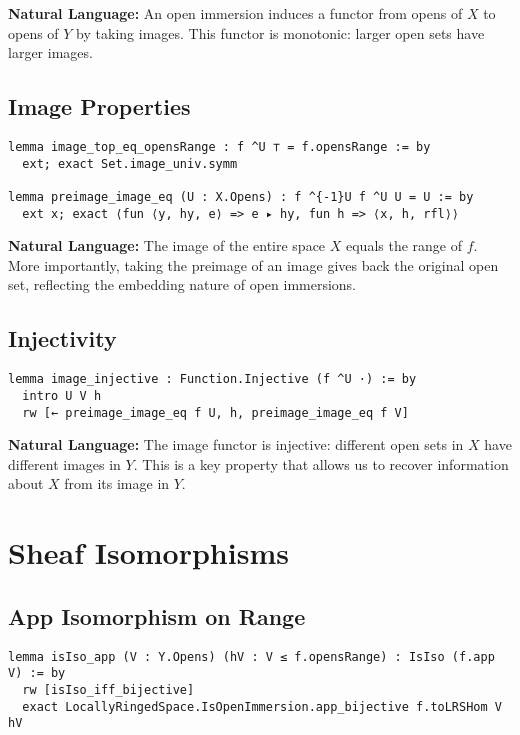\documentclass{article}
\theoremstyle{definition}
\begin{document}
\textbf{Natural Language:} An open immersion induces a functor from opens of $X$ to opens of $Y$ by taking images. This functor is monotonic: larger open sets have larger images.

\subsection{Image Properties}

\begin{lstlisting}
lemma image_top_eq_opensRange : f ^U ⊤ = f.opensRange := by
  ext; exact Set.image_univ.symm

lemma preimage_image_eq (U : X.Opens) : f ^{-1}U f ^U U = U := by
  ext x; exact ⟨fun ⟨y, hy, e⟩ => e ▸ hy, fun h => ⟨x, h, rfl⟩⟩
\end{lstlisting}

\textbf{Natural Language:} The image of the entire space $X$ equals the range of $f$. More importantly, taking the preimage of an image gives back the original open set, reflecting the embedding nature of open immersions.

\subsection{Injectivity}

\begin{lstlisting}
lemma image_injective : Function.Injective (f ^U ·) := by
  intro U V h
  rw [← preimage_image_eq f U, h, preimage_image_eq f V]
\end{lstlisting}

\textbf{Natural Language:} The image functor is injective: different open sets in $X$ have different images in $Y$. This is a key property that allows us to recover information about $X$ from its image in $Y$.

\section{Sheaf Isomorphisms}

\subsection{App Isomorphism on Range}

\begin{lstlisting}
lemma isIso_app (V : Y.Opens) (hV : V ≤ f.opensRange) : IsIso (f.app V) := by
  rw [isIso_iff_bijective]
  exact LocallyRingedSpace.IsOpenImmersion.app_bijective f.toLRSHom V hV
\end{lstlisting}
\end{document}
